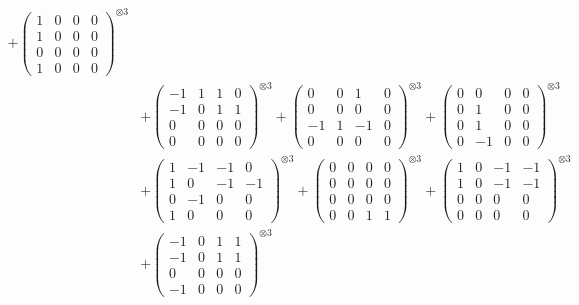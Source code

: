 \documentclass{article}
\begin{document}
{\begin{align}
            + \begin{pmatrix} 1 & 0 & 0 & 0 \\ 1 & 0 & 0 & 0 \\ 0 & 0 & 0 & 0 \\ 1 & 0 & 0 & 0 \end{pmatrix}^{\otimes 3} \\
        &+ \label{Rs16_Rc11_Solutions_Solution_6-c10} \begin{pmatrix} -1 & 1 & 1 & 0 \\ -1 & 0 & 1 & 1 \\ 0 & 0 & 0 & 0 \\ 0 & 0 & 0 & 0 \end{pmatrix}^{\otimes 3} 
            + \begin{pmatrix} 0 & 0 & 1 & 0 \\ 0 & 0 & 0 & 0 \\ -1 & 1 & -1 & 0 \\ 0 & 0 & 0 & 0 \end{pmatrix}^{\otimes 3} 
            + \begin{pmatrix} 0 & 0 & 0 & 0 \\ 0 & 1 & 0 & 0 \\ 0 & 1 & 0 & 0 \\ 0 & -1 & 0 & 0 \end{pmatrix}^{\otimes 3} \\
        &+ \label{Rs16_Rc11_Solutions_Solution_6-c13} \begin{pmatrix} 1 & -1 & -1 & 0 \\ 1 & 0 & -1 & -1 \\ 0 & -1 & 0 & 0 \\ 1 & 0 & 0 & 0 \end{pmatrix}^{\otimes 3} 
            + \begin{pmatrix} 0 & 0 & 0 & 0 \\ 0 & 0 & 0 & 0 \\ 0 & 0 & 0 & 0 \\ 0 & 0 & 1 & 1 \end{pmatrix}^{\otimes 3} 
            + \begin{pmatrix} 1 & 0 & -1 & -1 \\ 1 & 0 & -1 & -1 \\ 0 & 0 & 0 & 0 \\ 0 & 0 & 0 & 0 \end{pmatrix}^{\otimes 3} \\
        &+ \label{Rs16_Rc11_Solutions_Solution_6-c16} \begin{pmatrix} -1 & 0 & 1 & 1 \\ -1 & 0 & 1 & 1 \\ 0 & 0 & 0 & 0 \\ -1 & 0 & 0 & 0 \end{pmatrix}^{\otimes 3} \\

\end{align}}
\end{document}

